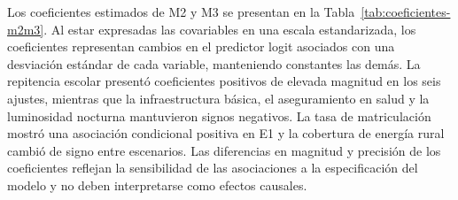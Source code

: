 \begin{table}[!htbp]
\centering
\footnotesize
\caption{Cambio en RMSE y MAE LODO al retirar cada covariable del escenario E1. Las diferencias se calculan como el error del modelo reducido menos el error del modelo completo; valores positivos indican deterioro predictivo. RMSE de referencia: 7.70 (M1), 5.10 (M2) y 6.04 (M3).}
\label{tab:ablacion}
\renewcommand{\arraystretch}{1.1}
\setlength{\tabcolsep}{5pt}
\end{table}

Los coeficientes estimados de M2 y M3 se presentan en la Tabla~\ref{tab:coeficientes-m2m3}. Al estar expresadas las covariables en una escala estandarizada, los coeficientes representan cambios en el predictor logit asociados con una desviación estándar de cada variable, manteniendo constantes las demás. La repitencia escolar presentó coeficientes positivos de elevada magnitud en los seis ajustes, mientras que la infraestructura básica, el aseguramiento en salud y la luminosidad nocturna mantuvieron signos negativos. La tasa de matriculación mostró una asociación condicional positiva en E1 y la cobertura de energía rural cambió de signo entre escenarios. Las diferencias en magnitud y precisión de los coeficientes reflejan la sensibilidad de las asociaciones a la especificación del modelo y no deben interpretarse como efectos causales.

